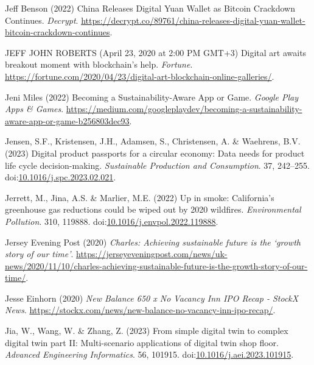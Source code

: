 \documentclass[
  letterpaper,
  DIV=11,
  numbers=noendperiod]{scrartcl}
\newlength{\cslhangindent}
\newenvironment{CSLReferences}[2] %
 {\begin{list}{}{%
  \setlength{\itemindent}{0pt}
  \setlength{\leftmargin}{0pt}
  \setlength{\parsep}{0pt}
  \ifodd #1
   \setlength{\leftmargin}{\cslhangindent}
   \setlength{\itemindent}{-1\cslhangindent}
  \fi
  \setlength{\itemsep}{#2\baselineskip}}}
 {\end{list}}
\begin{document}
\begin{CSLReferences}{0}{1}
Jeff Benson (2022) China {Releases Digital Yuan Wallet} as {Bitcoin
Crackdown Continues}. \emph{Decrypt}.
\url{https://decrypt.co/89761/china-releases-digital-yuan-wallet-bitcoin-crackdown-continues}.

JEFF JOHN ROBERTS (April 23, 2020 at 2:00 PM GMT+3) Digital art awaits
breakout moment with blockchain's help. \emph{Fortune}.
\url{https://fortune.com/2020/04/23/digital-art-blockchain-online-galleries/}.

Jeni Miles (2022) Becoming a {Sustainability-Aware App} or {Game}.
\emph{Google Play Apps \& Games}.
\url{https://medium.com/googleplaydev/becoming-a-sustainability-aware-app-or-game-b256803dec93}.

Jensen, S.F., Kristensen, J.H., Adamsen, S., Christensen, A. \&
Waehrens, B.V. (2023) Digital product passports for a circular economy:
{Data} needs for product life cycle decision-making. \emph{Sustainable
Production and Consumption}. 37, 242--255.
doi:\href{https://doi.org/10.1016/j.spc.2023.02.021}{10.1016/j.spc.2023.02.021}.

Jerrett, M., Jina, A.S. \& Marlier, M.E. (2022) Up in smoke:
{California}'s greenhouse gas reductions could be wiped out by 2020
wildfires. \emph{Environmental Pollution}. 310, 119888.
doi:\href{https://doi.org/10.1016/j.envpol.2022.119888}{10.1016/j.envpol.2022.119888}.

Jersey Evening Post (2020) \emph{Charles: {Achieving} sustainable future
is the {`growth story of our time'}}.
\url{https://jerseyeveningpost.com/news/uk-news/2020/11/10/charles-achieving-sustainable-future-is-the-growth-story-of-our-time/}.

Jesse Einhorn (2020) \emph{New {Balance} 650 x {No Vacancy Inn IPO
Recap} - {StockX News}}.
\url{https://stockx.com/news/new-balance-no-vacancy-inn-ipo-recap/}.

Jia, W., Wang, W. \& Zhang, Z. (2023) From simple digital twin to
complex digital twin part {II}: {Multi-scenario} applications of digital
twin shop floor. \emph{Advanced Engineering Informatics}. 56, 101915.
doi:\href{https://doi.org/10.1016/j.aei.2023.101915}{10.1016/j.aei.2023.101915}.


\end{CSLReferences}
\end{document}
